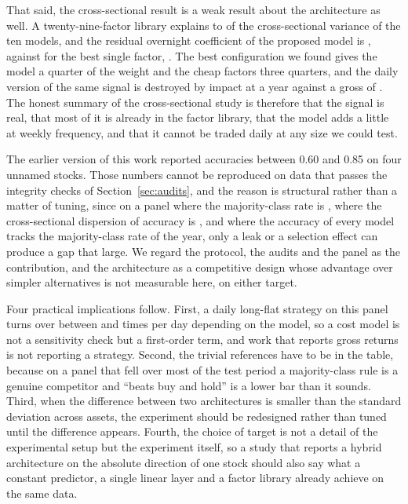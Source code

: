\documentclass[pdflatex,sn-mathphys-ay]{sn-jnl}
\theoremstyle{thmstyleone}%
\theoremstyle{thmstyletwo}%
\theoremstyle{thmstyletwo}%
\begin{document}
That said, the cross-sectional result is a weak result about the architecture as well. A
twenty-nine-factor library explains \rSquaredLo{} to \rSquaredHi{} of the cross-sectional variance of
the ten models, and the residual overnight coefficient of the proposed model is \residProp{}, against
\bestFactorResid{} for the best single factor, \bestFactorName. The best configuration we found gives
the model a quarter of the weight and the cheap factors three quarters, and the daily version of the
same signal is destroyed by impact at \impactDay{} a year against a gross of \grossDay. The honest
summary of the cross-sectional study is therefore that the signal is real, that most of it is already
in the factor library, that the model adds a little at weekly frequency, and that it cannot be traded
daily at any size we could test.

The earlier version of this work reported accuracies between 0.60 and 0.85 on four unnamed stocks.
Those numbers cannot be reproduced on data that passes the integrity checks of
Section~\ref{sec:audits}, and the reason is structural rather than a matter of tuning, since on a panel
where the majority-class rate is \accMaj, where the cross-sectional dispersion of accuracy is
\accPropSd, and where the accuracy of every model tracks the majority-class rate of the year, only a
leak or a selection effect can produce a gap that large. We regard the protocol, the audits and the
panel as the contribution, and the architecture as a competitive design whose advantage over simpler
alternatives is not measurable here, on either target.

Four practical implications follow. First, a daily long-flat strategy on this panel turns over between
\turnProp{} and \turnBest{} times per day depending on the model, so a cost model is not a sensitivity
check but a first-order term, and work that reports gross returns is not reporting a strategy. Second,
the trivial references have to be in the table, because on a panel that fell over most of the test
period a majority-class rule is a genuine competitor and ``beats buy and hold'' is a lower bar than it
sounds. Third, when the difference between two architectures is smaller than the standard deviation
across assets, the experiment should be redesigned rather than tuned until the difference appears.
Fourth, the choice of target is not a detail of the experimental setup but the experiment itself, so a
study that reports a hybrid architecture on the absolute direction of one stock should also say what a
constant predictor, a single linear layer and a factor library already achieve on the same data.
\end{document}
